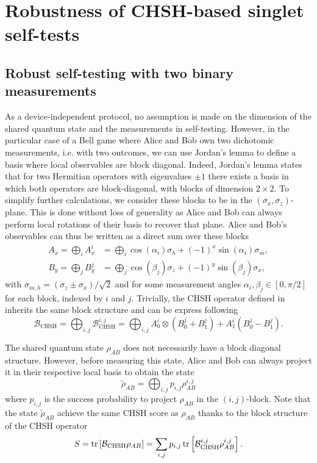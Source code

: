 \section{Robustness of CHSH-based singlet self-tests}

\subsection{Robust self-testing with two binary measurements}

As a device-independent protocol, no assumption is made on the dimension of the shared quantum state and the measurements in self-testing.
However, in the particular case of a Bell game where Alice and Bob own two dichotomic measurements, i.e. with two outcomes, we can use Jordan's lemma to define a basis where local observables are block diagonal.
Indeed, Jordan's lemma states that for two Hermitian operators with eigenvalues $\pm1$ there exists a basis in which both operators are block-diagonal, with blocks of dimension $2 \times 2$.
To simplify further calculations, we consider these blocks to be in the $(\sigma_x,\sigma_z)$-plane.
This is done without loss of generality as Alice and Bob can always perform local rotations of their basis to recover that plane.
Alice and Bob's observables can thus be written as a direct sum over these blocks 
\begin{equation}
	\begin{split}
	A_x = \bigoplus_i A_x^i &= \bigoplus_i \cos(\alpha_i)\sigma_h + (-1)^x \sin(\alpha_i)\sigma_m, \\
	B_y = \bigoplus_j B_y^j &= \bigoplus_j \cos(\beta_j)\sigma_z + (-1)^y \sin(\beta_j)\sigma_x,
	\end{split}
	\label{eq:block_observables}
\end{equation}
with $\sigma_{m,h} = (\sigma_z \pm \sigma_x)/\sqrt{2}$ and for some measurement angles $\alpha_i,\beta_j\in[0,\pi/2]$ for each block, indexed by $i$ and $j$.
Trivially, the CHSH operator defined in  inherits the same block structure and can be express following
\begin{equation}
	\mathcal{B}_\text{CHSH} = \bigoplus_{i,j} \mathcal{B}_\text{CHSH}^{i,j} = \bigoplus_{i,j} A_0^i \otimes (B_0^j + B_1^j) + A_1^i (B_0^j - B_1^j).
	\label{eq:block_operator}
\end{equation}

The shared quantum state $\rho_{AB}$ does not necessarily have a block diagonal structure. 
However, before measuring this state, Alice and Bob can always project it in their respective local basis to obtain the state
\begin{equation}
	\tilde{\rho}_{AB} = \bigoplus_{i,j} p_{i,j}\rho_{AB}^{i,j}
\end{equation}
where $p_{i,j}$ is the success probability to project $\rho_{AB}$ in the $(i,j)$-block.
Note that the state $\tilde{\rho}_{AB}$ achieve the same CHSH score as $\rho_{AB}$ thanks to the block structure of the CHSH operator
\begin{equation}
	S = \trr{\mathcal{B}_\text{CHSH}\rho_{AB}} = \sum_{i,j} p_{i,j} \trr{\mathcal{B}_\text{CHSH}^{i,j}\rho_{AB}^{i,j}}.
\end{equation}

